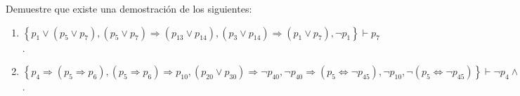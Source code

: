 \documentclass[12pt]{report}
\theoremstyle{largebreak}
\begin{document}
    \begin{excer}
        Demuestre que existe una demostración de los siguientes:
        \begin{enumerate}
            \item $\left\{p_1\lor(p_5\lor p_7),(p_5\lor p_7)\Rightarrow(p_{13}\lor p_{14}),(p_3\lor p_{14})\Rightarrow(p_1\lor p_7),\neg p_1 \right\}\vdash p_7$.
            \item $\left\{p_4\Rightarrow(p_5\Rightarrow p_6),(p_5\Rightarrow p_6)\Rightarrow p_{10},(p_{20}\lor p_{ 30})\Rightarrow \neg p_{ 40}, \neg p_{ 40}\Rightarrow( p_5\iff \neg p_{ 45}),\neg p_{10},\neg(p_5\iff\neg p_{45}) \right\}\vdash \neg p_4\land\neg(p_{20}\lor p_{30})$.
        \end{enumerate}
    \end{excer}
\end{document}

